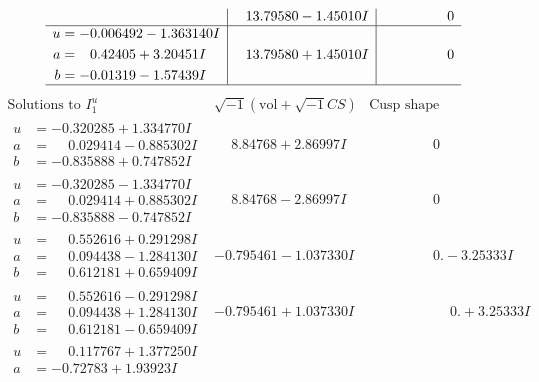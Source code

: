\documentclass[1p]{elsarticle_modified}
\theoremstyle{definition}
\newcommand{\I}{\sqrt{-1}}
\begin{document}
$$\begin{array}{c|c|c}
 & \phantom{-}13.79580 - 1.45010 I & \phantom{-0.000000 } 0 \\ \hline\begin{aligned}
u &= -0.006492 - 1.363140 I \\
a &= \phantom{-}0.42405 + 3.20451 I \\
b &= -0.01319 - 1.57439 I\end{aligned}
 & \phantom{-}13.79580 + 1.45010 I & \phantom{-0.000000 } 0\\
 \hline 
 \end{array}$$\newpage$$\begin{array}{c|c|c}  
\text{Solutions to }I^u_{1}& \I (\text{vol} + \sqrt{-1}CS) & \text{Cusp shape}\\
 \hline 
\begin{aligned}
u &= -0.320285 + 1.334770 I \\
a &= \phantom{-}0.029414 - 0.885302 I \\
b &= -0.835888 + 0.747852 I\end{aligned}
 & \phantom{-}8.84768 + 2.86997 I & \phantom{-0.000000 } 0 \\ \hline\begin{aligned}
u &= -0.320285 - 1.334770 I \\
a &= \phantom{-}0.029414 + 0.885302 I \\
b &= -0.835888 - 0.747852 I\end{aligned}
 & \phantom{-}8.84768 - 2.86997 I & \phantom{-0.000000 } 0 \\ \hline\begin{aligned}
u &= \phantom{-}0.552616 + 0.291298 I \\
a &= \phantom{-}0.094438 - 1.284130 I \\
b &= \phantom{-}0.612181 + 0.659409 I\end{aligned}
 & -0.795461 - 1.037330 I & \phantom{-0.000000 } 0. - 3.25333 I \\ \hline\begin{aligned}
u &= \phantom{-}0.552616 - 0.291298 I \\
a &= \phantom{-}0.094438 + 1.284130 I \\
b &= \phantom{-}0.612181 - 0.659409 I\end{aligned}
 & -0.795461 + 1.037330 I & \phantom{-0.000000 -}0. + 3.25333 I \\ \hline\begin{aligned}
u &= \phantom{-}0.117767 + 1.377250 I \\
a &= -0.72783 + 1.93923 I \\

\end{aligned}
\end{array}$$
\end{document}
